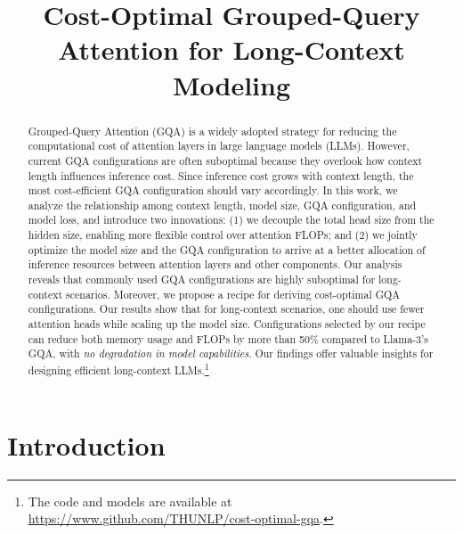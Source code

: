 \documentclass[11pt]{article}
\title{Cost-Optimal Grouped-Query Attention for Long-Context Modeling}
\author{Yingfa Chen$^{1*}$, Yutong Wu$^{2*}$, Chenyang Song$^1$, Zhenleng Thai$^1$, \\ \textbf{Xingyu Shen$^1$, Xu Han$^{1\dagger}$, Zhiyuan Liu$^{1\dagger}$, \and Maosong Sun$^1$}  \\
        $^1$NLP Group, DCST, IAI, BNRIST, Tsinghua University, Beijing, China \\ $^2$SIST, University of Science and Technology Beijing, Beijing, China \\ \texttt{chenyingfa1999@gmail.com, wuyutong\_yuna@163.com}
        \\ \texttt{\{han-xu,liuzy\}@tsinghua.edu.cn}
        }
\begin{document}
\maketitle
\begin{abstract}

Grouped-Query Attention (GQA) is a widely adopted strategy for reducing the computational cost of attention layers in large language models (LLMs). However, current GQA configurations are often suboptimal because they overlook how context length influences inference cost. Since inference cost grows with context length, the most cost-efficient GQA configuration should vary accordingly. In this work, we analyze the relationship among context length, model size, GQA configuration, and model loss, and introduce two innovations: (1) we decouple the total head size from the hidden size, enabling more flexible control over attention FLOPs; and (2) we jointly optimize the model size and the GQA configuration to arrive at a better allocation of inference resources between attention layers and other components. Our analysis reveals that commonly used GQA configurations are highly suboptimal for long-context scenarios. Moreover, we propose a recipe for deriving cost-optimal GQA configurations. Our results show that for long-context scenarios, one should use fewer attention heads while scaling up the model size. Configurations selected by our recipe can reduce both memory usage and FLOPs by more than 50\% compared to Llama-3's GQA, with \textit{no degradation in model capabilities}. Our findings offer valuable insights for designing efficient long-context LLMs.\footnote{The code and models are available at \url{https://www.github.com/THUNLP/cost-optimal-gqa}.}

\end{abstract}


\begingroup
\renewcommand{\thefootnote}{\fnsymbol{footnote}}
\endgroup



\section{Introduction}
\end{document}
